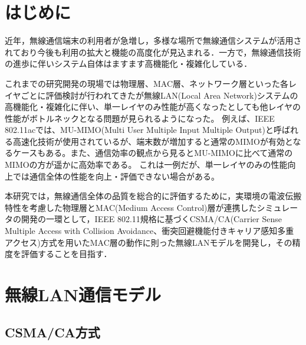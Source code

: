 \documentclass[a4paper,10pt]{ltjsarticle}
\begin{document}

\tableofcontents
\thispagestyle{empty}



\clearpage
\setcounter{page}{1}

\section{はじめに}

近年，無線通信端末の利用者が急増し，多様な場所で無線通信システムが活用されており今後も利用の拡大と機能の高度化が見込まれる．一方で，無線通信技術の進歩に伴いシステム自体はますます高機能化・複雑化している．


これまでの研究開発の現場では物理層、MAC層、ネットワーク層といった各レイヤごとに評価検討が行われてきたが無線LAN(Local Area Network)システムの高機能化・複雑化に伴い、単一レイヤのみ性能が高くなったとしても他レイヤの性能がボトルネックとなる問題が見られるようになった。
例えば、IEEE 802.11ac\cite{11std}では、MU-MIMO(Multi User Multiple Input Multiple Output)と呼ばれる高速化技術が使用されているが、端末数が増加すると通常のMIMOが有効となるケースもある。また、通信効率の観点から見るとMU-MIMOに比べて通常のMIMOの方が遥かに高効率である。
これは一例だが、単一レイヤのみの性能向上では通信全体の性能を向上・評価できない場合がある。



本研究では，無線通信全体の品質を総合的に評価するために，実環境の電波伝搬特性を考慮した物理層とMAC(Medium Access Control)層が連携したシミュレータの開発の一環として，IEEE 802.11規格に基づくCSMA/CA(Carrier Sense Multiple Access with Collision Avoidance、衝突回避機能付きキャリア感知多重アクセス)方式を用いたMAC層の動作に則った無線LANモデルを開発し，その精度を評価することを目指す．


\clearpage
\section{無線LAN通信モデル}

\subsection{CSMA/CA方式}
\end{document}
